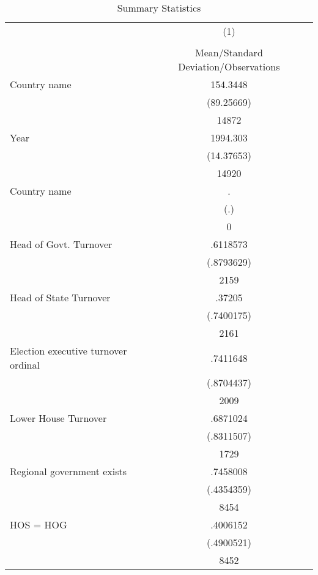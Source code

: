 {
\def\sym#1{\ifmmode^{#1}\else\(^{#1}\)\fi}
\begin{longtable}{l*{1}{c}}
\caption{Summary Statistics \label{sumstatsAll}}\\
\hline\hline\endfirsthead\hline\endhead\hline\endfoot\endlastfoot
                    &\multicolumn{1}{c}{(1)}\\
                    &\multicolumn{1}{c}{}\\
                    &Mean/Standard Deviation/Observations\\
\hline
Country name        &    154.3448\\
                    &  (89.25669)\\
                    &       14872\\
Year                &    1994.303\\
                    &  (14.37653)\\
                    &       14920\\
Country name        &           .\\
                    &         (.)\\
                    &           0\\
Head of Govt. Turnover&    .6118573\\
                    &  (.8793629)\\
                    &        2159\\
Head of State Turnover&      .37205\\
                    &  (.7400175)\\
                    &        2161\\
Election executive turnover ordinal&    .7411648\\
                    &  (.8704437)\\
                    &        2009\\
Lower House Turnover&    .6871024\\
                    &  (.8311507)\\
                    &        1729\\
Regional government exists   &    .7458008\\
                    &  (.4354359)\\
                    &        8454\\
HOS = HOG           &    .4006152\\
                    &  (.4900521)\\
                    &        8452\\

\end{longtable}}
